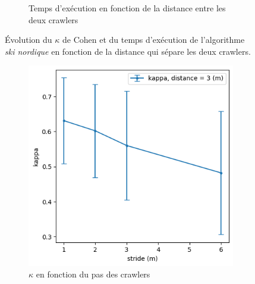 \documentclass[francais,RandD]{rapportPFE}
\begin{document}
\begin{figure}[h!]
\begin{subfigure}[t]{0.49\linewidth}
						\caption{Temps d'exécution en fonction de la distance entre les deux crawlers}
						\label{fig:ski_nordique-time_vs_distance}
				\end{subfigure}
				\caption{Évolution du $\kappa$ de Cohen et du temps d'exécution de l'algorithme \textit{ski nordique} en fonction de la distance qui sépare les deux crawlers.}
				\label{fig:ski_nordique-distance}
			\end{figure}

			\begin{figure}[h!]
				\begin{subfigure}[t]{0.49\linewidth}
					\includegraphics[width=\linewidth]{graphics/ski_nordique-kappa_vs_stride.png}
					\caption{$\kappa$ en fonction du pas des crawlers}
					\label{fig:ski_nordique-kappa_vs_stride}
				\end{subfigure}
				\hfill
				\begin{subfigure}[t]{0.49\linewidth}

\end{subfigure}
\end{figure}
\end{document}
